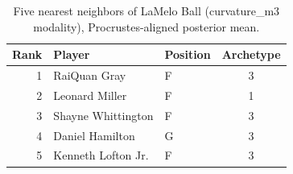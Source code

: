 \begin{table}[htbp]
  \centering\small
  \begin{tabular}{rllc}
    \toprule
    Rank & Player & Position & Archetype \\
    \midrule
    1 & RaiQuan Gray & F & 3 \\
    2 & Leonard Miller & F & 1 \\
    3 & Shayne Whittington & F & 3 \\
    4 & Daniel Hamilton & G & 3 \\
    5 & Kenneth Lofton Jr. & F & 3 \\
    \bottomrule
  \end{tabular}
  \caption{Five nearest neighbors of LaMelo Ball (curvature_m3 modality), Procrustes-aligned posterior mean.}
  \label{tab:LaMelo_Ball_neighbors_curvature_m3}
\end{table}


